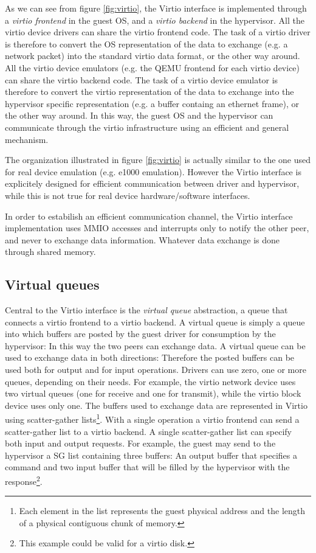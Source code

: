 As we can see from figure \ref{fig:virtio}, the Virtio interface is implemented through a \emph{virtio frontend} in the guest OS, and a 
\emph{virtio backend} in the hypervisor.
All the virtio device drivers can share the virtio frontend code. The task of a virtio driver is therefore to
convert the OS representation of the data to exchange (e.g. a network packet) into the standard virtio data format, or the other way
around. All the virtio device emulators (e.g. the QEMU frontend for each virtio device) can share the virtio backend code. The task
of a virtio device emulator is therefore to convert the virtio representation of the data to exchange into the hypervisor specific
representation (e.g. a buffer containg an ethernet frame), or the other way around. In this way, the guest OS and the hypervisor can
communicate through the virtio infrastructure using an efficient and general mechanism.

\vspace{0.5cm}

The organization illustrated in figure \ref{fig:virtio} is actually similar to the one used for real device emulation (e.g. e1000 
emulation). However the Virtio interface is explicitely designed for efficient communication between driver and hypervisor,
while this is not true for real device hardware/software interfaces.

\vspace{0.5cm}

In order to estabilish an efficient communication channel, the Virtio interface implementation uses MMIO accesses and interrupts only
to notify the other peer, and never to exchange data information. Whatever data exchange is done through shared memory.


\subsection{Virtual queues}
\label{sec:virtqueue}
Central to the Virtio interface is the \emph{virtual queue} abstraction, a queue that connects a virtio frontend to a virtio backend.
A virtual queue is simply a queue into which buffers are posted by the guest driver for consumption by the hypervisor: In this way
the two peers can exchange data.
A virtual queue can be used to exchange data in both directions: Therefore the posted buffers can be used both for output and for input 
operations. Drivers can use zero, one or more queues, depending on their needs. For example, the virtio network device uses two virtual
queues (one for receive and one for transmit), while the virtio block device uses only one.
The buffers used to exchange data are represented in Virtio using scatter-gather lists\footnote{Each
element in the list represents the guest physical address and the length of a physical contiguous chunk of memory.}. With a single operation
a virtio frontend can send a scatter-gather list to a virtio backend. A single scatter-gather list can specify both input and output 
requests. For example, the guest may send to the hypervisor a SG list containing three buffers: An output buffer that specifies a 
command and two input buffer that will be filled by the hypervisor with the response\footnote{This example could be valid for a virtio
disk.}.

